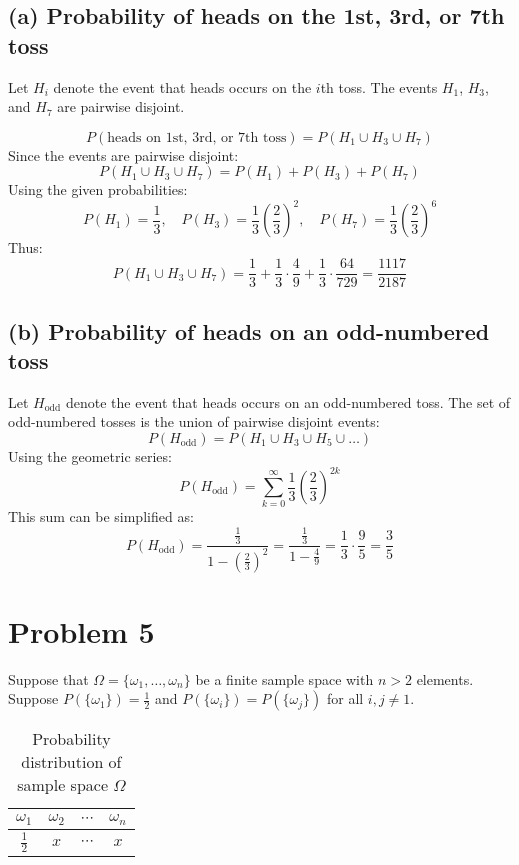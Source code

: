 \documentclass{article}
\begin{document}
\subsection*{(a) Probability of heads on the 1st, 3rd, or 7th toss}
Let $H_i$ denote the event that heads occurs on the $i$th toss. The events $H_1$, $H_3$, and $H_7$ are pairwise disjoint.

\[
P(\text{heads on 1st, 3rd, or 7th toss}) = P(H_1 \cup H_3 \cup H_7)
\]
Since the events are pairwise disjoint:
\[
P(H_1 \cup H_3 \cup H_7) = P(H_1) + P(H_3) + P(H_7)
\]
Using the given probabilities:
\[
P(H_1) = \frac{1}{3}, \quad P(H_3) = \frac{1}{3} \left(\frac{2}{3}\right)^2, \quad P(H_7) = \frac{1}{3} \left(\frac{2}{3}\right)^6
\]
Thus:
\[
P(H_1 \cup H_3 \cup H_7) = \frac{1}{3} + \frac{1}{3} \cdot \frac{4}{9} + \frac{1}{3} \cdot \frac{64}{729} = \boxed{\frac{1117}{2187}}
\]

\subsection*{(b) Probability of heads on an odd-numbered toss}
Let $H_{\text{odd}}$ denote the event that heads occurs on an odd-numbered toss. The set of odd-numbered tosses is the union of pairwise disjoint events:
\[
P(H_{\text{odd}}) = P(H_1 \cup H_3 \cup H_5 \cup \dots)
\]
Using the geometric series:
\[
P(H_{\text{odd}}) = \sum_{k=0}^{\infty} \frac{1}{3} \left(\frac{2}{3}\right)^{2k}
\]
This sum can be simplified as:
\[
P(H_{\text{odd}}) = \frac{\frac{1}{3}}{1 - \left(\frac{2}{3}\right)^2} = \frac{\frac{1}{3}}{1 - \frac{4}{9}} = \frac{1}{3} \cdot \frac{9}{5} = \boxed{\frac{3}{5}}
\]

\section*{Problem 5}
Suppose that $\Omega = \{\omega_1, \ldots, \omega_n\}$ be a finite sample space with $n > 2$ elements. Suppose $P(\{\omega_1\}) = \frac{1}{2}$ and $P(\{\omega_i\}) = P(\{\omega_j\})$ for all $i, j \neq 1$.


\begin{table}[h]
\centering
\begin{tabular}{|c|c|c|c|}
\hline
$\omega_1$ & $\omega_2$ & $\cdots$ & $\omega_n$ \\
\hline
$\frac{1}{2}$ & $x$ & $\cdots$ & $x$ \\
\hline
\end{tabular}
\caption{Probability distribution of sample space $\Omega$}
\end{table}
\end{document}
